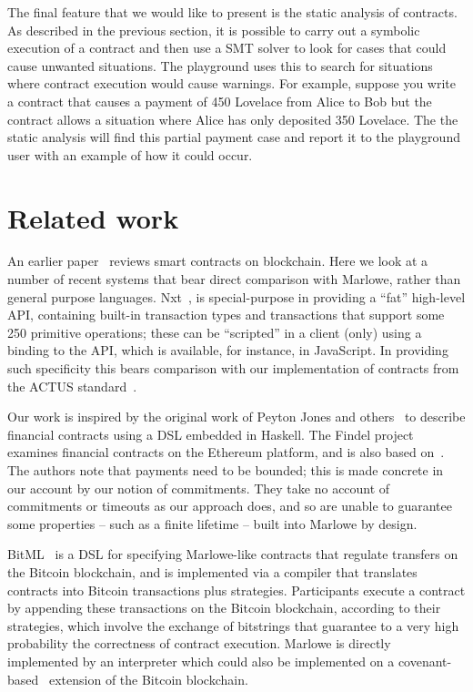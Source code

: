 \documentclass[runningheads]{llncs}
\begin{document}
The final feature that we would like to present is the static analysis of contracts. As described in the previous section, it is possible to carry out a symbolic execution of a contract and then use a SMT solver to look for cases that could cause unwanted situations. The playground uses this to search for situations where contract execution would cause warnings. For example, suppose you write a contract that causes a payment of 450 Lovelace from Alice to Bob but the contract allows a situation where Alice has only deposited 350 Lovelace. The the static analysis will find this partial payment case and report it to the playground user with an example of how it could occur.

\section{Related work}
\label{sec:related}

An earlier paper~\cite{cryptoeprint:2016:1156} reviews smart contracts on blockchain. Here we look at a number of recent systems that bear direct comparison with Marlowe, rather than general purpose languages.
Nxt~\cite{Nxt}, is special-purpose in providing a ``fat'' high-level
API, containing built-in transaction types and transactions that support some 250 primitive operations; these can be ``scripted'' in a client (only) using a binding to the API, which is available, for instance, in JavaScript. In providing such specificity this bears comparison with our implementation of contracts from the ACTUS standard~\cite{actus}.

Our work is inspired by the original work of Peyton Jones and others~\cite{PeytonJones:2000} to describe financial contracts using a DSL embedded in Haskell. The Findel project~\cite{findel} examines financial contracts on the Ethereum platform, and is also based on~\cite{PeytonJones:2000}. The authors note that payments need to be bounded; this is made concrete in our
account by our notion of commitments. They take no account of commitments or timeouts as our approach does, and so are unable to guarantee some properties -- such as a finite lifetime -- built into Marlowe by design.

BitML~\cite{BitML} is a DSL for specifying Marlowe-like contracts that regulate transfers on the Bitcoin blockchain, and is implemented via a compiler that translates contracts into  Bitcoin transactions plus strategies. Participants execute a contract by appending these transactions on the Bitcoin blockchain, according to their strategies, which involve the exchange of bitstrings that guarantee to a very high probability the correctness of contract execution. Marlowe is directly implemented by an interpreter which could also be implemented on a covenant-based~\cite{covenants} extension of the Bitcoin blockchain.
\end{document}
